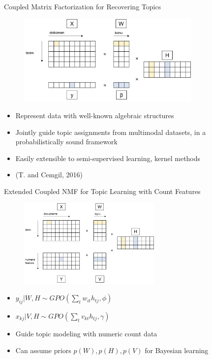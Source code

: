 \documentclass[pdf]{beamer}
\begin{document}
\begin{frame}{Coupled Matrix Factorization for Recovering Topics}
	
	\begin{figure}[h]
		\centering
		\includegraphics[width=9cm]{images/nmf2.png}
	\end{figure}
	
	\begin{itemize}
		
		\item Represent data with well-known algebraic structures
		\item Jointly guide topic assignments from multimodal datasets, in a probabilistically sound framework
		\item Easily extensible to semi-supervised learning, kernel methods
		\item (T. and Cemgil, 2016)
	\end{itemize}
	
\end{frame}

\begin{frame}{Extended Coupled NMF for Topic Learning with Count Features}
	
	\begin{figure}[h]
		\centering
		\includegraphics[width=7cm]{images/ext_nmf.png}
	\end{figure}
	
	\begin{itemize}
		\item $ y_{ij} | W, H \sim GPO(\sum_{t} w_{it} h_{tj}, \phi) $
		\item $ x_{kj} | V, H \sim GPO(\sum_{t} v_{kt} h_{tj}, \gamma) $
		\item Guide topic modeling with numeric count data
		\item Can assume priors $p(W), p(H), p(V)$ for Bayesian learning
	\end{itemize}
	
\end{frame}
\end{document}
